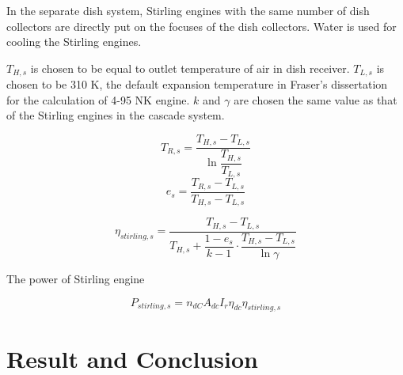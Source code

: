 \documentclass{article}
\begin{document}
In the separate dish system, Stirling engines with the same number of dish collectors are directly put on the focuses of the dish collectors. Water is used for cooling the Stirling engines.

$T_{H,s}$ is chosen to be equal to outlet temperature of air in dish receiver. $T_{L,s}$ is chosen to be 310 K, the default expansion temperature in Fraser's dissertation~\cite{Fraser2008} for the calculation of 4-95 NK\uppercase\expandafter{} engine. $k$ and $\gamma$ are chosen the same value as that of the Stirling engines in the cascade system.

\begin{equation*}
	T_{R,s}=\dfrac{T_{H,s}-T_{L,s}}{\ln\dfrac{T_{H,s}}{T_{L,s}}}
\end{equation*}
\begin{equation*}
	e_{s}=\dfrac{T_{R,s}-T_{L,s}}{T_{H,s}-T_{L,s}}
\end{equation*}

\begin{equation*}
	\eta_{stirling,s}=\dfrac{T_{H,s}-T_{L,s}}{T_{H,s}+\dfrac{1-e_{s}}{k-1}\cdot\dfrac{T_{H,s}-T_{L,s}}{\ln\gamma}}
\end{equation*}

The power of Stirling engine

\begin{equation*}
	P_{stirling,s}=n_{dC}A_{dc}I_r\eta_{dc}\eta_{stirling,s}
\end{equation*}

\section{Result and Conclusion}

\printnomenclature[2.5cm]{}
\clearpage



\end{document}
